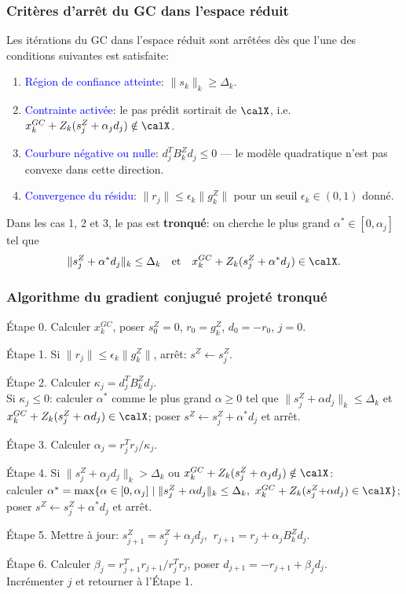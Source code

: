 \documentclass[t,aspectratio=169,usepdftitle=false]{beamer}
\def\blue{\color{blue}}
\def\cX{\calX}
\begin{document}
\begin{frame}
\frametitle{Critères d'arrêt du GC dans l'espace réduit}

Les itérations du GC dans l'espace réduit sont arrêtées dès que l'une des conditions suivantes est satisfaite:

\begin{enumerate}
\item \textcolor{blue}{Région de confiance atteinte}: $\| s_k \|_k \geq \Delta_k$.
\item \textcolor{blue}{Contrainte activée}: le pas prédit sortirait de $\cX$, i.e.
$x_k^{GC} + Z_k(s_j^Z + \alpha_j d_j) \notin \cX$.
\item \textcolor{blue}{Courbure négative ou nulle}: $d_j^T B_k^Z d_j \leq 0$ — le modèle quadratique n'est pas convexe dans cette direction.
\item \textcolor{blue}{Convergence du résidu}: $\| r_j \| \leq \epsilon_k \| g_k^Z \|$ pour un seuil $\epsilon_k \in (0,1)$ donné.
\end{enumerate}

\mbox{}

Dans les cas 1, 2 et 3, le pas est \textbf{tronqué}: on cherche le plus grand $\alpha^* \in [0, \alpha_j]$ tel que
$$
\| s_j^Z + \alpha^* d_j \|_k \leq \Delta_k \quad \text{et} \quad x_k^{GC} + Z_k(s_j^Z + \alpha^* d_j) \in \cX.
$$

\end{frame}

\begin{frame}
\frametitle{Algorithme du gradient conjugué projeté tronqué}

{\blue Étape 0.} Calculer $x_k^{GC}$, poser $s_0^Z = 0$, $r_0 = g_k^Z$, $d_0 = -r_0$, $j = 0$.

{\blue Étape 1.} Si $\| r_j \| \leq \epsilon_k \| g_k^Z \|$, arrêt: $s^Z \leftarrow s_j^Z$.

{\blue Étape 2.} Calculer $\kappa_j = d_j^T B_k^Z d_j$.\\
Si $\kappa_j \leq 0$: calculer $\alpha^*$ comme le plus grand $\alpha \geq 0$ tel que $\| s_j^Z + \alpha d_j \|_k \leq \Delta_k$ et $x_k^{GC} + Z_k(s_j^Z + \alpha d_j) \in \cX$; poser $s^Z \leftarrow s_j^Z + \alpha^* d_j$ et arrêt.

{\blue Étape 3.} Calculer $\alpha_j = r_j^T r_j / \kappa_j$.

{\blue Étape 4.} Si $\| s_j^Z + \alpha_j d_j \|_k > \Delta_k$ ou $x_k^{GC} + Z_k(s_j^Z + \alpha_j d_j) \notin \cX$:\\
calculer $\alpha^* = \max\{ \alpha \in [0,\alpha_j] \mid \| s_j^Z + \alpha d_j \|_k \leq \Delta_k,\ x_k^{GC} + Z_k(s_j^Z{+}\alpha d_j) \in \cX \}$;\\
poser $s^Z \leftarrow s_j^Z + \alpha^* d_j$ et arrêt.

{\blue Étape 5.} Mettre à jour: $s_{j+1}^Z = s_j^Z + \alpha_j d_j$, $\ r_{j+1} = r_j + \alpha_j B_k^Z d_j$.

{\blue Étape 6.} Calculer $\beta_j = r_{j+1}^T r_{j+1} / r_j^T r_j$, poser $d_{j+1} = -r_{j+1} + \beta_j d_j$.\\
Incrémenter $j$ et retourner à l'Étape 1.

\end{frame}
\end{document}
